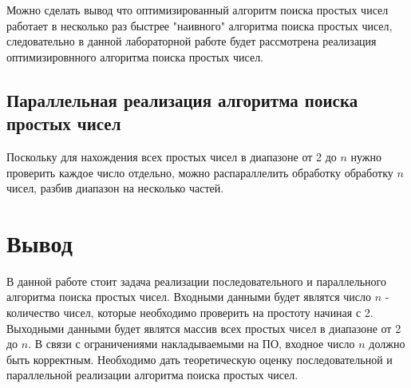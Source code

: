 Можно сделать вывод что оптимизированный алгоритм поиска простых чисел работает в несколько раз быстрее "наивного" алгоритма поиска простых чисел, следовательно в данной лабораторной работе будет рассмотрена реализация оптимизировнного алгоритма поиска простых чисел. 

\subsection{Параллельная реализация алгоритма поиска простых чисел}

Поскольку для нахождения всех простых чисел в диапазоне от 2 до $n$ нужно проверить каждое число отдельно, можно распараллелить обработку обработку $n$ чисел, разбив диапазон на несколько частей. 

\section*{Вывод} 
В данной работе стоит задача реализации последовательного и параллельного алгоритма поиска простых чисел. Входными данными будет являтся число $n$ - количество чисел, которые необходимо проверить на простоту начиная с 2. Выходными данными будет являтся массив всех простых чисел в диапазоне от 2 до $n$. В связи с ограничениями накладываемыми на ПО, входное число $n$ должно быть корректным. Необходимо дать теоретическую оценку последовательной и параллельной реализации алгоритма поиска простых чисел. 
